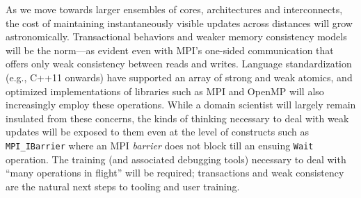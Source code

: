 As we move towards larger ensembles of cores, architectures
and interconnects, the cost of
maintaining instantaneously visible updates across distances 
will grow astronomically.
%
Transactional behaviors and weaker memory consistency models 
will be the norm---as evident even with MPI's one-sided communication
that offers only weak consistency between reads and writes.
%
Language standardization (e.g., C++11 onwards) have supported an
array of strong and weak atomics, and optimized implementations of
libraries such as MPI and OpenMP will also increasingly employ these
operations.
%
While a domain scientist will largely remain insulated from these
concerns, the kinds of thinking necessary to deal with weak updates
will be exposed to them even at the level of constructs such
as \verb|MPI_IBarrier| where an MPI {\em barrier} does not block 
till an ensuing \verb|Wait| operation.
%
The training (and associated debugging tools) necessary to deal
with  ``many operations in flight'' will be required; transactions
and weak consistency are the natural next steps to tooling and
user training.
 
